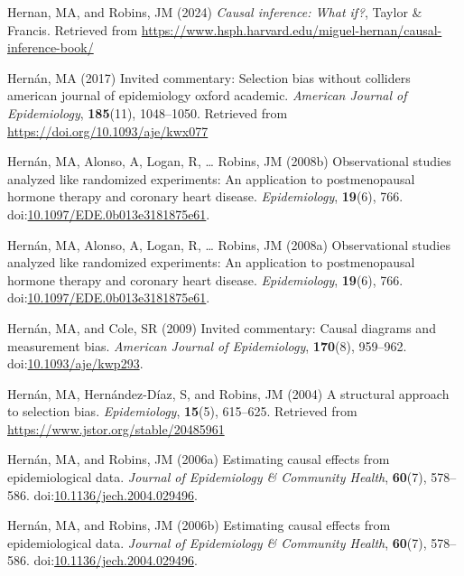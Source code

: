 \documentclass[
  single column]{article}
\newlength{\cslhangindent}
\newenvironment{CSLReferences}[2] %
 {\begin{list}{}{%
  \setlength{\itemindent}{0pt}
  \setlength{\leftmargin}{0pt}
  \setlength{\parsep}{0pt}
  \ifodd #1
   \setlength{\leftmargin}{\cslhangindent}
   \setlength{\itemindent}{-1\cslhangindent}
  \fi
  \setlength{\itemsep}{#2\baselineskip}}}
 {\end{list}}
\begin{document}
\begin{CSLReferences}{1}{0}
Hernan, MA, and Robins, JM (2024) \emph{Causal inference: What if?},
Taylor \& Francis. Retrieved from
\url{https://www.hsph.harvard.edu/miguel-hernan/causal-inference-book/}

Hernán, MA (2017) Invited commentary: Selection bias without colliders
\textbar{} american journal of epidemiology \textbar{} oxford academic.
\emph{American Journal of Epidemiology}, \textbf{185}(11), 1048--1050.
Retrieved from \url{https://doi.org/10.1093/aje/kwx077}

Hernán, MA, Alonso, A, Logan, R, \ldots{} Robins, JM (2008b)
Observational studies analyzed like randomized experiments: An
application to postmenopausal hormone therapy and coronary heart
disease. \emph{Epidemiology}, \textbf{19}(6), 766.
doi:\href{https://doi.org/10.1097/EDE.0b013e3181875e61}{10.1097/EDE.0b013e3181875e61}.

Hernán, MA, Alonso, A, Logan, R, \ldots{} Robins, JM (2008a)
Observational studies analyzed like randomized experiments: An
application to postmenopausal hormone therapy and coronary heart
disease. \emph{Epidemiology}, \textbf{19}(6), 766.
doi:\href{https://doi.org/10.1097/EDE.0b013e3181875e61}{10.1097/EDE.0b013e3181875e61}.

Hernán, MA, and Cole, SR (2009) Invited commentary: Causal diagrams and
measurement bias. \emph{American Journal of Epidemiology},
\textbf{170}(8), 959--962.
doi:\href{https://doi.org/10.1093/aje/kwp293}{10.1093/aje/kwp293}.

Hernán, MA, Hernández-Díaz, S, and Robins, JM (2004) A structural
approach to selection bias. \emph{Epidemiology}, \textbf{15}(5),
615--625. Retrieved from \url{https://www.jstor.org/stable/20485961}

Hernán, MA, and Robins, JM (2006a) Estimating causal effects from
epidemiological data. \emph{Journal of Epidemiology \& Community
Health}, \textbf{60}(7), 578--586.
doi:\href{https://doi.org/10.1136/jech.2004.029496}{10.1136/jech.2004.029496}.

Hernán, MA, and Robins, JM (2006b) Estimating causal effects from
epidemiological data. \emph{Journal of Epidemiology \& Community
Health}, \textbf{60}(7), 578--586.
doi:\href{https://doi.org/10.1136/jech.2004.029496}{10.1136/jech.2004.029496}.


\end{CSLReferences}
\end{document}

